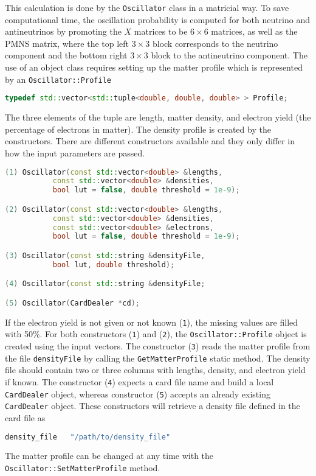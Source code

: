 \documentclass[a4paper, 11pt]{article}
\begin{document}
This calculation is done by the \texttt{Oscillator} class in a matricial way. 
To save computational time, the oscillation probability is computed for both neutrino and antineutrinos %
by promoting the $X$ matrices to be $6\times 6$ matrices, as well as the PMNS matrix, %
where the top left $3\times 3$ block corresponds to the neutrino component and the bottom right $3\times 3$ block to the antineutrino component.
The use of an object class requires setting up the matter profile which is represented by an \texttt{Oscillator::Profile}
\begin{lstlisting}[language=C++]
    typedef std::vector<std::tuple<double, double, double> > Profile;
\end{lstlisting}
The three elements of the tuple are length, matter density, and electron yield (the percentage of electrons in matter).
The density profile is created by the constructors.
There are different constructors available and they only differ in how the input parameters are passed.
\begin{lstlisting}[language=C++]
(1) Oscillator(const std::vector<double> &lengths,
	       const std::vector<double> &densities,
	       bool lut = false, double threshold = 1e-9);

(2) Oscillator(const std::vector<double> &lengths,
	       const std::vector<double> &densities,
	       const std::vector<double> &electrons,
	       bool lut = false, double threshold = 1e-9);

(3) Oscillator(const std::string &densityFile,
	       bool lut, double threshold);

(4) Oscillator(const std::string &densityFile;

(5) Oscillator(CardDealer *cd);
\end{lstlisting}
If the electron yield is not given or not known (\texttt{1}), the missing values are filled with 50\%.
For both constructors (\texttt{1}) and (\texttt{2}), the \texttt{Oscillator::Profile} object is created using the input vectors.
The constructor (\texttt{3}) reads the matter profile from the file \texttt{densityFile} by calling the \texttt{GetMatterProfile} static method.
The density file should contain two or three columns with lengths, density, and electron yield if known.
The constructor (\texttt{4}) expects a card file name and build a local \texttt{CardDealer} object, %
whereas constructor (\texttt{5}) accepts an already existing \texttt{CardDealer} object.
These constructors will retrieve a density file defined in the card file as
\begin{lstlisting}[language=bash]
    density_file   "/path/to/density_file"
\end{lstlisting}
The matter profile can be changed at any time with the \texttt{Oscillator::SetMatterProfile} method.
\end{document}
